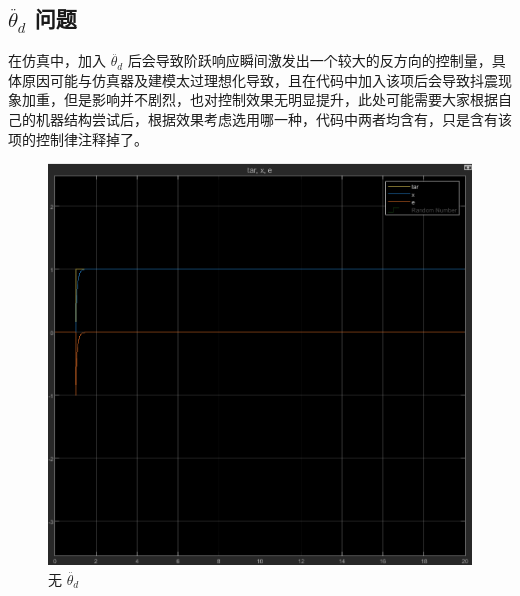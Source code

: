 \documentclass[12pt]{article}
\begin{document}
    \subsection{$\ddot{\theta_d}$ 问题}
    在仿真中，加入 $\ddot{\theta_d}$ 后会导致阶跃响应瞬间激发出一个较大的反方向的控制量，具体原因可能与仿真器及建模太过理想化导致，且在代码中加入该项后会导致抖震现象加重，但是影响并不剧烈，也对控制效果无明显提升，此处可能需要大家根据自己的机器结构尝试后，根据效果考虑选用哪一种，代码中两者均含有，只是含有该项的控制律注释掉了。
        \begin{figure}[htbp]
            \centering
            \begin{minipage}[t]{0.48\textwidth}
                \centering
                \includegraphics[width=\textwidth]{../other/Yaw_11.png}
                \caption{无 $\ddot{\theta_d}$}
                \end{minipage}
                \hfill
                \begin{minipage}[t]{0.48\textwidth}
                \centering

\end{minipage}
\end{figure}
\end{document}
